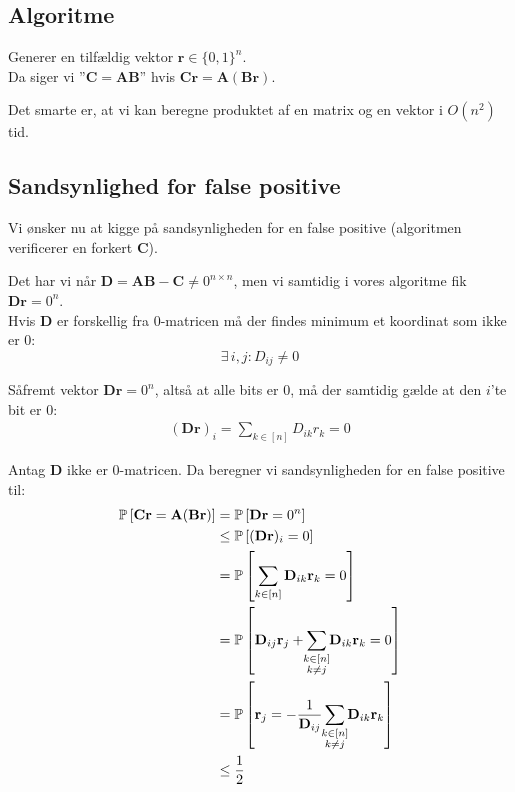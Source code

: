 \subsection{Algoritme}
Generer en tilfældig vektor $\mathbf r \in \{0, 1\}^n$.\\
Da siger vi ''$\mathbf C = \mathbf{AB}$'' hvis $\mathbf{Cr} = \mathbf A (\mathbf{Br})$.


Det smarte er, at vi kan beregne produktet af en matrix og en vektor i $O(n^2)$ tid.


\subsection{Sandsynlighed for false positive}
Vi ønsker nu at kigge på sandsynligheden for en false positive (algoritmen verificerer en forkert $\mathbf C$).

Det har vi når $\mathbf D = \mathbf{AB} - \mathbf C \neq 0^{n \times n}$, men vi samtidig i vores algoritme fik $\mathbf{Dr} = 0^n$.\\

Hvis $\mathbf D$ er forskellig fra 0-matricen må der findes minimum et koordinat som ikke er 0:
$$
\exists \, i,j : D_{ij} \neq 0
$$

Såfremt vektor $\mathbf{Dr} = 0^n$, altså at alle bits er 0, må der samtidig gælde at den $i$'te bit er 0:
\begin{align*}
  (\mathbf{Dr})_i = \sum_{k \in [n]} D_{ik} r_k = 0
\end{align*}

Antag $\mathbf D$ ikke er 0-matricen. Da beregner vi sandsynligheden for en false positive til:
\begin{align}
  \P{\mathbf{Cr} = \mathbf A (\mathbf{Br})}
  &= \P{\mathbf{Dr} = 0^n} \label{eq:matrix-to-vec} \\
  &\leq \P{(\mathbf{Dr})_i = 0} \label{eq:vec-to-cord} \\
  &= \P{\sum_{k \in [n]} \mathbf D_{ik} \mathbf r_k = 0} \label{eq:vec-mul} \\
  &= \P{\mathbf D_{ij} \mathbf r_j + \summ{k \in [n]\\ k \neq j} \mathbf D_{ik} \mathbf r_k = 0 } \label{eq:split-sum} \\
  &= \P{\mathbf r_j = - \frac{1}{\mathbf D_{ij}} \summ{k \in [n]\\ k \neq j} \mathbf D_{ik} \mathbf r_k} \label{eq:minus-og-div} \\
  &\leq \frac{1}{2} \label{eq:benyt-unikt-rj}
\end{align}

